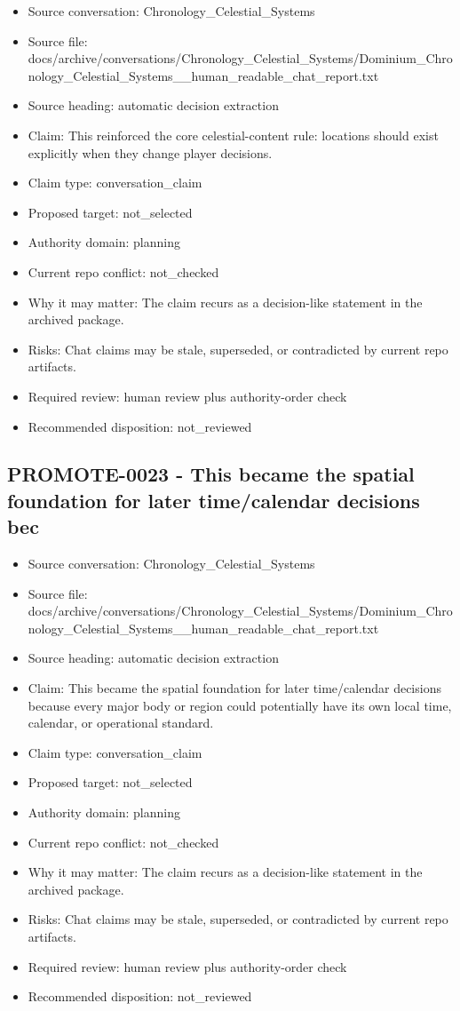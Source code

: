 \documentclass[11pt,a4paper]{report}
\begin{document}
\begin{itemize}
\item Source conversation: Chronology\_Celestial\_Systems
\item Source file: docs/archive/conversations/Chronology\_Celestial\_Systems/Dominium\_Chronology\_Celestial\_Systems\_\_human\_readable\_chat\_report.txt
\item Source heading: automatic decision extraction
\item Claim: This reinforced the core celestial-content rule: locations should exist explicitly when they change player decisions.
\item Claim type: conversation\_claim
\item Proposed target: not\_selected
\item Authority domain: planning
\item Current repo conflict: not\_checked
\item Why it may matter: The claim recurs as a decision-like statement in the archived package.
\item Risks: Chat claims may be stale, superseded, or contradicted by current repo artifacts.
\item Required review: human review plus authority-order check
\item Recommended disposition: not\_reviewed
\end{itemize}

\subsection{PROMOTE-0023 - This became the spatial foundation for later time/calendar decisions bec}

\begin{itemize}
\item Source conversation: Chronology\_Celestial\_Systems
\item Source file: docs/archive/conversations/Chronology\_Celestial\_Systems/Dominium\_Chronology\_Celestial\_Systems\_\_human\_readable\_chat\_report.txt
\item Source heading: automatic decision extraction
\item Claim: This became the spatial foundation for later time/calendar decisions because every major body or region could potentially have its own local time, calendar, or operational standard.
\item Claim type: conversation\_claim
\item Proposed target: not\_selected
\item Authority domain: planning
\item Current repo conflict: not\_checked
\item Why it may matter: The claim recurs as a decision-like statement in the archived package.
\item Risks: Chat claims may be stale, superseded, or contradicted by current repo artifacts.
\item Required review: human review plus authority-order check
\item Recommended disposition: not\_reviewed
\end{itemize}
\end{document}
